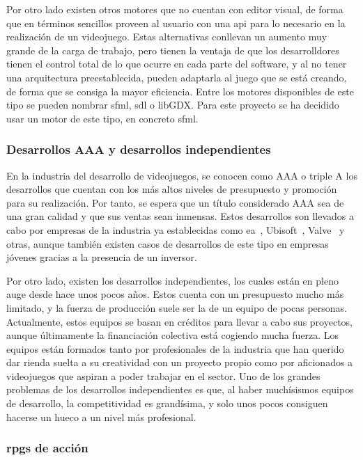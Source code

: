 			Por otro lado existen otros motores que no cuentan con editor visual, de forma que en términos sencillos proveen al usuario con una \acrshort{api} para lo necesario en la realización de un videojuego. Estas alternativas conllevan un aumento muy grande de la carga de trabajo, pero tienen la ventaja de que los desarrolldores tienen el control total de lo que ocurre en cada parte del software, y al no tener una arquitectura preestablecida, pueden adaptarla al juego que se está creando, de forma que se consiga la mayor eficiencia. Entre los motores disponibles de este tipo se pueden nombrar \acrshort{sfml}, \acrshort{sdl} o libGDX. Para este proyecto se ha decidido usar un motor de este tipo, en concreto \acrshort{sfml}.

		\subsubsection{Desarrollos AAA y desarrollos independientes}

			En la industria del desarrollo de videojuegos, se conocen como AAA o triple A los desarrollos que cuentan con los más altos niveles de presupuesto y promoción para su realización. Por tanto, se espera que un título considerado AAA sea de una gran calidad y que sus ventas sean inmensas. Estos desarrollos son llevados a cabo por empresas de la industria ya establecidas como \acrshort{ea}~\cite{ea}, Ubisoft~\cite{ubisoft}, Valve~\cite{valve} y otras, aunque también existen casos de desarrollos de este tipo en empresas jóvenes gracias a la presencia de un inversor.

			Por otro lado, existen los desarrollos independientes, los cuales están en pleno auge desde hace unos pocos años. Estos cuenta con un presupuesto mucho más limitado, y la fuerza de producción suele ser la de un equipo de pocas personas. Actualmente, estos equipos se basan en créditos para llevar a cabo sus proyectos, aunque últimamente la financiación colectiva está cogiendo mucha fuerza. Los equipos están formados tanto por profesionales de la industria que han querido dar rienda suelta a su creatividad con un proyecto propio como por aficionados a videojuegos que aspiran a poder trabajar en el sector. Uno de los grandes problemas de los desarrollos independientes es que, al haber muchísismos equipos de desarrollo, la competitividad es grandísima, y solo unos pocos consiguen hacerse un hueco a un nivel más profesional.

		\subsubsection{\acrshort{rpg}s de acción}

